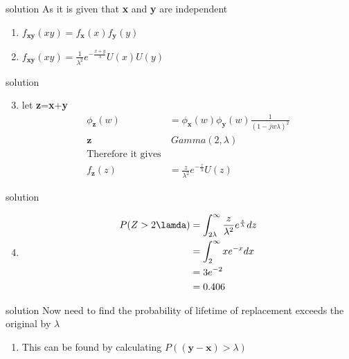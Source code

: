 \documentclass{beamer}
\begin{document}
\begin{frame}{solution}
As it is given that \textbf{x} and \textbf{y} are independent
\begin{enumerate}
    \item $f_{\textbf{xy}}(xy) = f_{\textbf{x}}(x)f_{\textbf{y}}(y)$
    \item $f_{\textbf{xy}}(xy) = \frac{1}{\lambda^2}e^{-\frac{x+y}{\lambda}}U(x)U(y)$
\end{enumerate}
\end{frame}


\begin{frame}{solution}
\begin{enumerate}
\setcounter{enumi}{2}
\item let \textbf{z}=\textbf{x}+\textbf{y}
\begin{align}
    \phi_{\textbf{z}}(w) & = \phi_{\textbf{x}}(w)\phi_{\textbf{y}}(w)\frac{1}{(1-jw\lambda)^2}\\
        \textbf{z} &~ Gamma(2,\lambda)\\
\text{Therefore it gives}\nonumber\\
f_{\textbf{z}}(z) & = \frac{z}{\lambda^2}e^{-\frac{z}{\lambda}}U(z) 
    \end{align}
\end{enumerate}
\end{frame}
     

\begin{frame}{solution}
\begin{enumerate}
\setcounter{enumi}{3}
\item \begin{align}
P(Z>2\lamda) & = \int_{2\lambda}^{\infty}\frac{z}{\lambda^2}e^{_\frac{z}{\lambda}}dz\\
             & = \int_{2}^{\infty}xe^{-x}dx\nonumber\\
             & = 3e^{-2}\nonumber\\
             & = 0.406
\end{align}
\end{enumerate}
\end{frame}


\begin{frame}{solution}
Now need to find the probability of lifetime of replacement exceeds the original by $\lambda$ \\
\begin{enumerate}
    \item This can be found by calculating $P((\textbf{y}-\textbf{x})>\lambda)$
\end{enumerate}
\end{frame}
\end{document}
